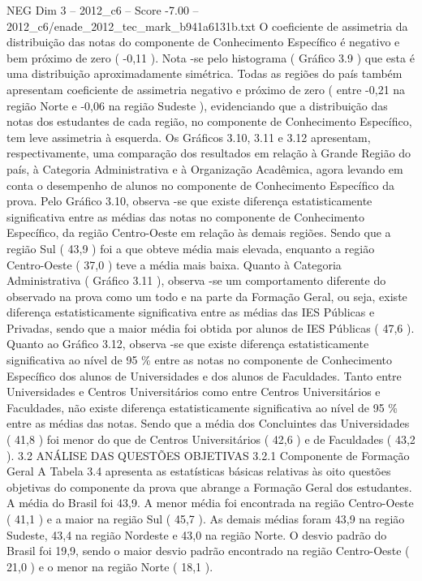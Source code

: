 \begin{textsample}{NEG Dim 3 – 2012\_c6 – Score -7.00 – 2012\_c6/enade\_2012\_tec\_mark\_b941a6131b.txt}
O coeficiente de assimetria da distribuição das notas do componente de Conhecimento Específico é negativo e bem próximo de zero ( -0,11 ).
Nota -se pelo histograma ( Gráfico 3.9 ) que esta é uma distribuição aproximadamente simétrica.
Todas as regiões do país também apresentam coeficiente de assimetria negativo e próximo de zero ( entre -0,21 na região Norte e -0,06 na região Sudeste ), evidenciando que a distribuição das notas dos estudantes de cada região, no componente de Conhecimento Específico, tem leve assimetria à esquerda.
Os Gráficos 3.10, 3.11 e 3.12 apresentam, respectivamente, uma comparação dos resultados em relação à Grande Região do país, à Categoria Administrativa e à Organização Acadêmica, agora levando em conta o desempenho de alunos no componente de Conhecimento Específico da prova.
Pelo Gráfico 3.10, observa -se que existe diferença estatisticamente significativa entre as médias das notas no componente de Conhecimento Específico, da região Centro-Oeste em relação às demais regiões.
Sendo que a região Sul ( 43,9 ) foi a que obteve média mais elevada, enquanto a região Centro-Oeste ( 37,0 ) teve a média mais baixa.
Quanto à Categoria Administrativa ( Gráfico 3.11 ), observa -se um comportamento diferente do observado na prova como um todo e na parte da Formação Geral, ou seja, existe diferença estatisticamente significativa entre as médias das IES Públicas e Privadas, sendo que a maior média foi obtida por alunos de IES Públicas ( 47,6 ).
Quanto ao Gráfico 3.12, observa -se que existe diferença estatisticamente significativa ao nível de 95 \% entre as notas no componente de Conhecimento Específico dos alunos de Universidades e dos alunos de Faculdades.
Tanto entre Universidades e Centros Universitários como entre Centros Universitários e Faculdades, não existe diferença estatisticamente significativa ao nível de 95 \% entre as médias das notas.
Sendo que a média dos Concluintes das Universidades ( 41,8 ) foi menor do que de Centros Universitários ( 42,6 ) e de Faculdades ( 43,2 ). 3.2 ANÁLISE DAS QUESTÕES OBJETIVAS 3.2.1 Componente de Formação Geral A Tabela 3.4 apresenta as estatísticas básicas relativas às oito questões objetivas do componente da prova que abrange a Formação Geral dos estudantes.
A média do Brasil foi 43,9.
A menor média foi encontrada na região Centro-Oeste ( 41,1 ) e a maior na região Sul ( 45,7 ).
As demais médias foram 43,9 na região Sudeste, 43,4 na região Nordeste e 43,0 na região Norte.
O desvio padrão do Brasil foi 19,9, sendo o maior desvio padrão encontrado na região Centro-Oeste ( 21,0 ) e o menor na região Norte ( 18,1 ).

\end{textsample}
